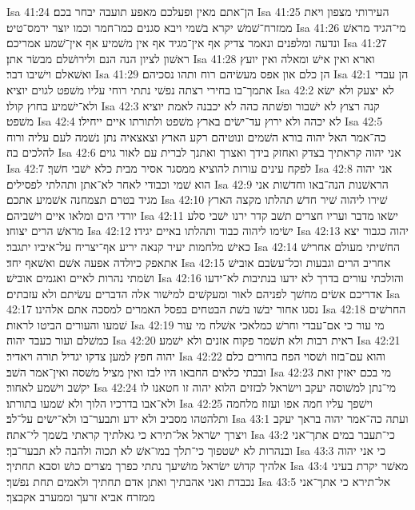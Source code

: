 Isa 41:24  הן־אתם מאין ופעלכם מאפע תועבה יבחר בכם׃
Isa 41:25  העירותי מצפון ויאת ממזרח־שׁמשׁ יקרא בשׁמי ויבא סגנים כמו־חמר וכמו יוצר ירמס־טיט׃
Isa 41:26  מי־הגיד מראשׁ ונדעה ומלפנים ונאמר צדיק אף אין־מגיד אף אין משׁמיע אף אין־שׁמע אמריכם׃
Isa 41:27  ראשׁון לציון הנה הנם ולירושׁלם מבשׂר אתן׃
Isa 41:28  וארא ואין אישׁ ומאלה ואין יועץ ואשׁאלם וישׁיבו דבר׃
Isa 41:29  הן כלם און אפס מעשׂיהם רוח ותהו נסכיהם׃
Isa 42:1  הן עבדי אתמך־בו בחירי רצתה נפשׁי נתתי רוחי עליו משׁפט לגוים יוציא׃
Isa 42:2  לא יצעק ולא ישׂא ולא־ישׁמיע בחוץ קולו׃
Isa 42:3  קנה רצוץ לא ישׁבור ופשׁתה כהה לא יכבנה לאמת יוציא משׁפט׃
Isa 42:4  לא יכהה ולא ירוץ עד־ישׂים בארץ משׁפט ולתורתו איים ייחילו׃
Isa 42:5  כה־אמר האל יהוה בורא השׁמים ונוטיהם רקע הארץ וצאצאיה נתן נשׁמה לעם עליה ורוח להלכים בה׃
Isa 42:6  אני יהוה קראתיך בצדק ואחזק בידך ואצרך ואתנך לברית עם לאור גוים׃
Isa 42:7  לפקח עינים עורות להוציא ממסגר אסיר מבית כלא ישׁבי חשׁך׃
Isa 42:8  אני יהוה הוא שׁמי וכבודי לאחר לא־אתן ותהלתי לפסילים׃
Isa 42:9  הראשׁנות הנה־באו וחדשׁות אני מגיד בטרם תצמחנה אשׁמיע אתכם׃
Isa 42:10  שׁירו ליהוה שׁיר חדשׁ תהלתו מקצה הארץ יורדי הים ומלאו איים וישׁביהם׃
Isa 42:11  ישׂאו מדבר ועריו חצרים תשׁב קדר ירנו ישׁבי סלע מראשׁ הרים יצוחו׃
Isa 42:12  ישׂימו ליהוה כבוד ותהלתו באיים יגידו׃
Isa 42:13  יהוה כגבור יצא כאישׁ מלחמות יעיר קנאה יריע אף־יצריח על־איביו יתגבר׃
Isa 42:14  החשׁיתי מעולם אחרישׁ אתאפק כיולדה אפעה אשׁם ואשׁאף יחד׃
Isa 42:15  אחריב הרים וגבעות וכל־עשׂבם אובישׁ ושׂמתי נהרות לאיים ואגמים אובישׁ׃
Isa 42:16  והולכתי עורים בדרך לא ידעו בנתיבות לא־ידעו אדריכם אשׂים מחשׁך לפניהם לאור ומעקשׁים למישׁור אלה הדברים עשׂיתם ולא עזבתים׃
Isa 42:17  נסגו אחור יבשׁו בשׁת הבטחים בפסל האמרים למסכה אתם אלהינו׃
Isa 42:18  החרשׁים שׁמעו והעורים הביטו לראות׃
Isa 42:19  מי עור כי אם־עבדי וחרשׁ כמלאכי אשׁלח מי עור כמשׁלם ועור כעבד יהוה׃
Isa 42:20  ראית רבות ולא תשׁמר פקוח אזנים ולא ישׁמע׃
Isa 42:21  יהוה חפץ למען צדקו יגדיל תורה ויאדיר׃
Isa 42:22  והוא עם־בזוז ושׁסוי הפח בחורים כלם ובבתי כלאים החבאו היו לבז ואין מציל משׁסה ואין־אמר השׁב׃
Isa 42:23  מי בכם יאזין זאת יקשׁב וישׁמע לאחור׃
Isa 42:24  מי־נתן למשׁוסה יעקב וישׂראל לבזזים הלוא יהוה זו חטאנו לו ולא־אבו בדרכיו הלוך ולא שׁמעו בתורתו׃
Isa 42:25  וישׁפך עליו חמה אפו ועזוז מלחמה ותלהטהו מסביב ולא ידע ותבער־בו ולא־ישׂים על־לב׃
Isa 43:1  ועתה כה־אמר יהוה בראך יעקב ויצרך ישׂראל אל־תירא כי גאלתיך קראתי בשׁמך לי־אתה׃
Isa 43:2  כי־תעבר במים אתך־אני ובנהרות לא ישׁטפוך כי־תלך במו־אשׁ לא תכוה ולהבה לא תבער־בך׃
Isa 43:3  כי אני יהוה אלהיך קדושׁ ישׂראל מושׁיעך נתתי כפרך מצרים כושׁ וסבא תחתיך׃
Isa 43:4  מאשׁר יקרת בעיני נכבדת ואני אהבתיך ואתן אדם תחתיך ולאמים תחת נפשׁך׃
Isa 43:5  אל־תירא כי אתך־אני ממזרח אביא זרעך וממערב אקבצך׃
